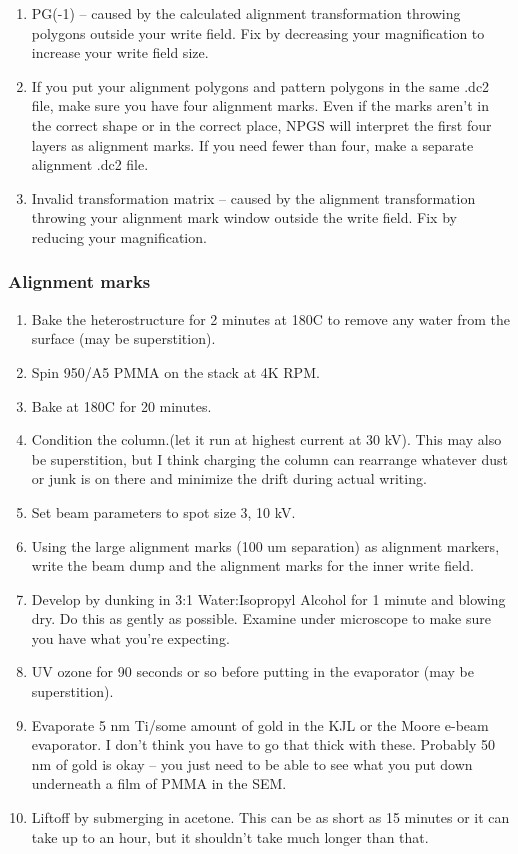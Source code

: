 \begin{appendices}
\begin{enumerate}
\begin{enumerate}
		\item PG(-1) – caused by the calculated alignment transformation throwing polygons outside your write field. Fix by decreasing your magnification to increase your write field size.
		\item If you put your alignment polygons and pattern polygons in the same .dc2 file, make sure you have four alignment marks. Even if the marks aren’t in the correct shape or in the correct place, NPGS will interpret the first four layers as alignment marks. If you need fewer than four, make a separate alignment .dc2 file.
		\item Invalid transformation matrix – caused by the alignment transformation throwing your alignment mark window outside the write field. Fix by reducing your magnification.
	\end{enumerate}
\end{enumerate}

\subsubsection{Alignment marks}
\begin{enumerate}
	\item Bake the heterostructure for 2 minutes at 180C to remove any water from the surface (may be superstition).
	\item Spin 950/A5 PMMA on the stack at 4K RPM.
	\item Bake at 180C for 20 minutes.
	\item Condition the column.(let it run at highest current at 30 kV). This may also be superstition, but I think charging the column can rearrange whatever dust or junk is on there and minimize the drift during actual writing.
	\item Set beam parameters to spot size 3, 10 kV.
	\item Using the large alignment marks (100 um separation) as alignment markers, write the beam dump and the alignment marks for the inner write field.
	\item Develop by dunking in 3:1 Water:Isopropyl Alcohol for 1 minute and blowing dry. Do this as gently as possible. Examine under microscope to make sure you have what you’re expecting.
	\item UV ozone for 90 seconds or so before putting in the evaporator (may be superstition).
	\item Evaporate 5 nm Ti/some amount of gold in the KJL or the Moore e-beam evaporator. I don’t think you have to go that thick with these. Probably 50 nm of gold is okay – you just need to be able to see what you put down underneath a film of PMMA in the SEM.
	\item Liftoff by submerging in acetone. This can be as short as 15 minutes or it can take up to an hour, but it shouldn’t take much longer than that.
\end{enumerate}


\end{appendices}
